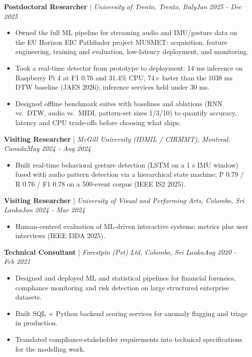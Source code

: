 \documentclass[11pt]{article}
\newenvironment{cvrole}[5]{%
  \par\noindent\textbf{\large #1} | \textit{\small #2, #3}\hfill \textit{\small #4 - #5}\par
  \begin{itemize}[leftmargin=2em, itemsep=-0.3em, topsep=-0.5em]%
}{%
  \end{itemize}\par\noindent\mbox{}\par\vspace{0.1em}%
}
\begin{document}
\begin{cvrole}{Postdoctoral Researcher}{University of Trento}{Trento, Italy}{Jan 2025}{Dec 2025}
    \item Owned the full ML pipeline for streaming audio and IMU/gesture data on the EU Horizon EIC Pathfinder project MUSMET: acquisition, feature engineering, training and evaluation, low-latency deployment, and monitoring.
    \item Took a real-time detector from prototype to deployment: 14 ms inference on Raspberry Pi 4 at F1 0.76 and 31.4\% CPU, 74$\times$ faster than the 1038 ms DTW baseline (JAES 2026); inference services held under 30 ms.
    \item Designed offline benchmark suites with baselines and ablations (RNN vs.\ DTW, audio vs.\ MIDI, pattern-set sizes 1/3/10) to quantify accuracy, latency and CPU trade-offs before choosing what ships.
\end{cvrole}

\begin{cvrole}{Visiting Researcher}{McGill University (IDMIL / CIRMMT)}{Montreal, Canada}{May 2024}{Aug 2024}
    \item Built real-time behavioral gesture detection (LSTM on a 1 s IMU window) fused with audio pattern detection via a hierarchical state machine; P 0.79 / R 0.76 / F1 0.78 on a 500-event corpus (IEEE IS2 2025).
\end{cvrole}

\begin{cvrole}{Visiting Researcher}{University of Visual and Performing Arts}{Colombo, Sri Lanka}{Jan 2024}{Mar 2024}
    \item Human-centred evaluation of ML-driven interactive systems: metrics plus user interviews (IEEE I3DA 2025).
\end{cvrole}

\begin{cvrole}{Technical Consultant}{Forestpin (Pvt) Ltd}{Colombo, Sri Lanka}{Aug 2020}{Feb 2021}
    \item Designed and deployed ML and statistical pipelines for financial forensics, compliance monitoring and risk detection on large structured enterprise datasets.
    \item Built SQL + Python backend scoring services for anomaly flagging and triage in production.
    \item Translated compliance-stakeholder requirements into technical specifications for the modelling work.
\end{cvrole}
\end{document}
